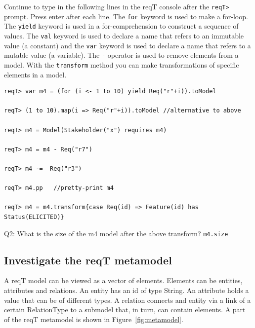 \documentclass[11pt]{article}
\begin{document}
Continue to type in the following lines in the reqT console after the \verb+reqT>+ prompt. Press enter after each line. The \verb+for+ keyword is used to make a for-loop. The \verb+yield+ keyword is used in a for-comprehension to construct a sequence of values.  The \verb+val+ keyword is used to declare a name that refers to an immutable value (a constant) and the \verb+var+ keyword is used to declare a name that refers to a mutable value (a variable). The \verb?-? operator is used to remove elements from a model. With the \verb+transform+ method you can make transformations of specific elements in a model. 


{\footnotesize\begin{verbatim}
reqT> var m4 = (for (i <- 1 to 10) yield Req("r"+i)).toModel

reqT> (1 to 10).map(i => Req("r"+i)).toModel //alternative to above

reqT> m4 = Model(Stakeholder("x") requires m4)

reqT> m4 = m4 - Req("r7")

reqT> m4 -=  Req("r3")

reqT> m4.pp   //pretty-print m4

reqT> m4 = m4.transform{case Req(id) => Feature(id) has Status(ELICITED)}

\end{verbatim}}

\begin{framed}\noindent
Q2: What is the size of the m4 model after the above transform? 
\newline
\verb+m4.size+
\newline
\newline \underline{\hspace{11.9cm}}
\end{framed}

\subsection{Investigate the reqT metamodel}

A reqT model can be viewed as a vector of elements. Elements can be entities, attributes and relations. An entity has an id of type String. An attribute holds a value that can be of different types. A relation connects and entity via a link of a certain RelationType to a submodel that, in turn, can contain elements. A part of the reqT metamodel is shown in Figure~\ref{fig:metamodel}. 
\end{document}
